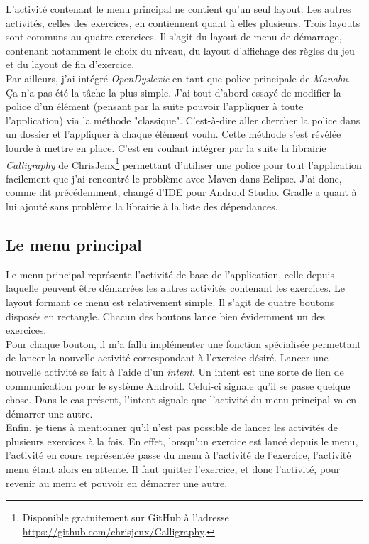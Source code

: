 L'activité contenant le menu principal ne contient qu'un seul layout. Les autres activités, celles des exercices, en contiennent quant à elles plusieurs. Trois layouts sont communs au quatre exercices. Il s'agit du layout de menu de démarrage, contenant notamment le choix du niveau, du layout d'affichage des règles du jeu et du layout de fin d'exercice.\\

Par ailleurs, j'ai intégré \textit{OpenDyslexic} en tant que police principale de \textit{Manabu}. Ça n'a pas été la tâche la plus simple. J'ai tout d'abord essayé de modifier la police d'un élément (pensant par la suite pouvoir l'appliquer à toute l'application) via la méthode "classique". C'est-à-dire aller chercher la police dans un dossier et l'appliquer à chaque élément voulu. Cette méthode s'est révélée lourde à mettre en place. C'est en voulant intégrer par la suite la librairie \textit{Calligraphy} de ChrisJenx\footnote{Disponible gratuitement sur GitHub à l'adresse \url{https://github.com/chrisjenx/Calligraphy}.} permettant d'utiliser une police pour tout l'application facilement que j'ai rencontré le problème avec Maven dans Eclipse. J'ai donc, comme dit précédemment, changé d'IDE pour Android Studio. Gradle a quant à lui ajouté sans problème la librairie à la liste des dépendances.

\subsection{Le menu principal}
Le menu principal représente l'activité de base de l'application, celle depuis laquelle peuvent être démarrées les autres activités contenant les exercices. Le layout formant ce menu est relativement simple. Il s'agit de quatre boutons disposés en rectangle. Chacun des boutons lance bien évidemment un des exercices.\\

Pour chaque bouton, il m'a fallu implémenter une fonction spécialisée permettant de lancer la nouvelle activité correspondant à l'exercice désiré.
Lancer une nouvelle activité se fait à l'aide d'un \textit{intent}. Un intent est une sorte de lien de communication pour le système Android. Celui-ci signale qu'il se passe quelque chose. Dans le cas présent, l'intent signale que l'activité du menu principal va en démarrer une autre.\\

Enfin, je tiens à mentionner qu'il n'est pas possible de lancer les activités de plusieurs exercices à la fois. En effet, lorsqu'un exercice est lancé depuis le menu, l'activité en cours représentée passe du menu à l'activité de l'exercice, l'activité menu étant alors en attente. Il faut quitter l'exercice, et donc l'activité, pour revenir au menu et pouvoir en démarrer une autre.


